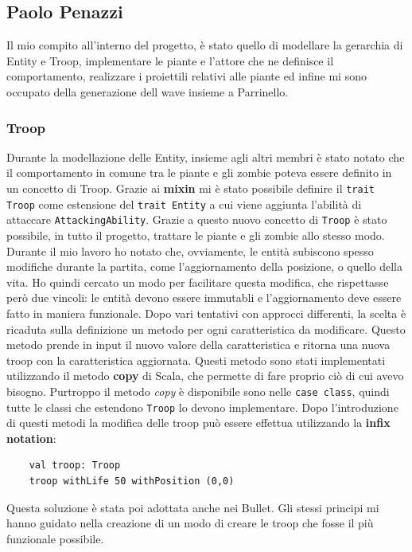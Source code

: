 \subsection{Paolo Penazzi}
Il mio compito all’interno del progetto, è stato quello di modellare la gerarchia di Entity e Troop,
implementare le piante e l'attore che ne definisce il comportamento, realizzare i proiettili relativi alle piante ed
infine mi sono occupato della generazione dell wave insieme a Parrinello.

\subsubsection{Troop}
Durante la modellazione delle Entity, insieme agli altri membri è stato notato che il comportamento in comune tra le
piante e gli zombie poteva essere definito in un concetto di Troop.
Grazie ai \textbf{mixin} mi è stato possibile definire il \texttt{trait Troop} come estensione del \texttt{trait Entity}
a cui viene aggiunta l'abilità di attaccare \texttt{AttackingAbility}.
Grazie a questo nuovo concetto di \texttt{Troop} è stato possibile, in tutto il progetto, trattare le piante e gli zombie
allo stesso modo.
Durante il mio lavoro ho notato che, ovviamente, le entità subiscono spesso modifiche durante la partita, come
l'aggiornamento della posizione, o quello della vita.
Ho quindi cercato un modo per facilitare questa modifica, che rispettasse però due vincoli: le entità devono essere
immutabli e l'aggiornamento deve essere fatto in maniera funzionale.
Dopo vari tentativi con approcci differenti, la scelta è ricaduta sulla definizione un metodo per ogni caratteristica
da modificare.
Questo metodo prende in input il nuovo valore della caratteristica e ritorna una nuova troop con la caratteristica
aggiornata.
Questi metodo sono stati implementati utilizzando il metodo \textbf{copy} di Scala, che permette di fare proprio ciò
di cui avevo bisogno.
Purtroppo il metodo \textit{copy} è disponibile sono nelle \texttt{case class}, quindi tutte le classi che estendono
\texttt{Troop} lo devono implementare.
Dopo l'introduzione di questi metodi la modifica delle troop può essere effettua utilizzando la \textbf{infix notation}:
\begin{lstlisting}
    val troop: Troop
    troop withLife 50 withPosition (0,0)
\end{lstlisting}
Questa soluzione è stata poi adottata anche nei Bullet.
Gli stessi principi mi hanno guidato nella creazione di un modo di creare le troop che fosse il più funzionale possibile.
